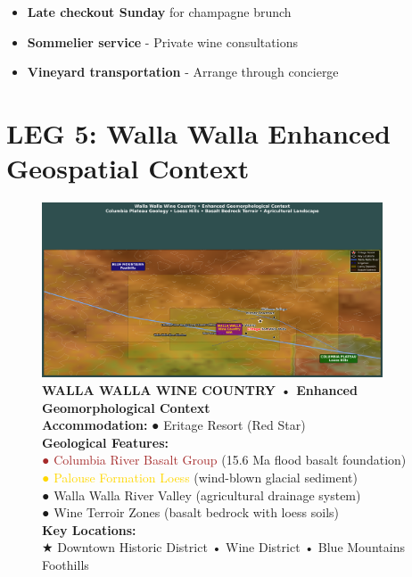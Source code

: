 \documentclass[
  11pt,
]{article}
\providecommand{\tightlist}{%
  \setlength{\itemsep}{0pt}\setlength{\parskip}{0pt}}
\begin{document}
\begin{itemize}
\tightlist
\item
  \textbf{\textcolor{secondary}{Late checkout Sunday}} for champagne
  brunch
\item
  \textbf{\textcolor{secondary}{Sommelier service}} - Private wine
  consultations\\
\item
  \textbf{\textcolor{secondary}{Vineyard transportation}} - Arrange
  through concierge
\end{itemize}

\newpage

\section{\texorpdfstring{\textcolor{primary}{LEG 5: Walla Walla Enhanced Geospatial Context}}{}}\label{section-38}

\begin{figure}[H]
\centering
\includegraphics[width=0.9\textwidth]{images/walla_walla_enhanced_geospatial.png}
\caption{\textbf{\textcolor{primary}{WALLA WALLA WINE COUNTRY • Enhanced Geomorphological Context}} \\ 
\textbf{\textcolor{secondary}{Accommodation:}} \textcolor{mapred}{●} Eritage Resort (Red Star) \\
\textbf{\textcolor{secondary}{Geological Features:}} \\
\textcolor{brown}{●} \textcolor{brown}{Columbia River Basalt Group} (15.6 Ma flood basalt foundation) \\
\textcolor{gold}{●} \textcolor{gold}{Palouse Formation Loess} (wind-blown glacial sediment) \\
\textcolor{mapblue}{●} \textcolor{mapblue}{Walla Walla River Valley} (agricultural drainage system) \\
\textcolor{mapgreen}{●} \textcolor{mapgreen}{Wine Terroir Zones} (basalt bedrock with loess soils) \\
\textbf{\textcolor{secondary}{Key Locations:}} \\
\textcolor{mapred}{★} Downtown Historic District • Wine District • Blue Mountains Foothills}
\end{figure}
\end{document}
